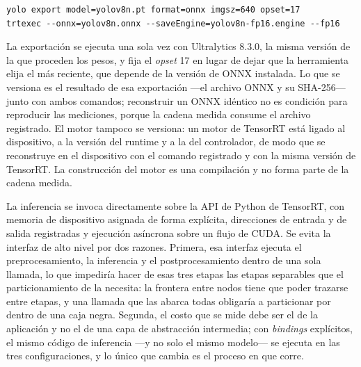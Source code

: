 \begin{verbatim}
yolo export model=yolov8n.pt format=onnx imgsz=640 opset=17
trtexec --onnx=yolov8n.onnx --saveEngine=yolov8n-fp16.engine --fp16
\end{verbatim}

La exportación se ejecuta una sola vez con Ultralytics 8.3.0, la misma
versión de la que proceden los pesos, y fija el \emph{opset} 17 en lugar de
dejar que la herramienta elija el más reciente, que depende de la versión de
ONNX instalada. Lo que se versiona es el resultado de esa exportación —el
archivo ONNX y su SHA-256— junto con ambos comandos; reconstruir un ONNX
idéntico no es condición para reproducir las mediciones, porque la cadena
medida consume el archivo registrado. El motor tampoco se versiona: un motor
de TensorRT está ligado al dispositivo, a la versión del runtime y a la del
controlador, de modo que se reconstruye en el dispositivo con el comando
registrado y con la misma versión de TensorRT. La construcción del motor es
una compilación y no forma parte de la cadena medida.

La inferencia se invoca directamente sobre la API de Python de TensorRT, con
memoria de dispositivo asignada de forma explícita, direcciones de entrada y
de salida registradas y ejecución asíncrona sobre un flujo de CUDA. Se evita
la interfaz de alto nivel por dos razones. Primera, esa interfaz ejecuta el
preprocesamiento, la inferencia y el postprocesamiento dentro de una sola
llamada, lo que impediría hacer de esas tres etapas las etapas separables que
el particionamiento de la  necesita: la frontera
entre nodos tiene que poder trazarse entre etapas, y una llamada que las
abarca todas obligaría a particionar por dentro de una caja negra. Segunda,
el costo que se mide debe ser el de la aplicación y no el de una capa de
abstracción intermedia; con \emph{bindings} explícitos, el mismo código de
inferencia —y no solo el mismo modelo— se ejecuta en las tres
configuraciones, y lo único que cambia es el proceso en que corre.

